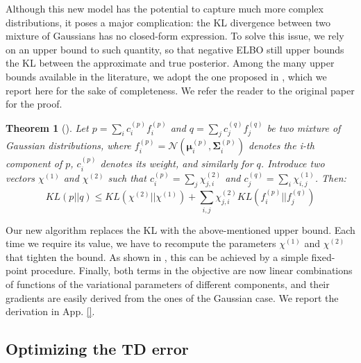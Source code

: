 \documentclass{article}
\newtheorem{theorem}{Theorem}
\begin{document}
Although this new model has the potential to capture much more complex distributions, it poses a major complication: the KL divergence between two mixture of Gaussians has no closed-form expression. To solve this issue, we rely on an upper bound to such quantity, so that negative ELBO still upper bounds the KL between the approximate and true posterior. Among the many upper bounds available in the literature, we adopt the one proposed in \cite{hershey2007approximating}, which we report here for the sake of completeness. We refer the reader to the original paper for the proof.
\begin{theorem}[\cite{hershey2007approximating}]
Let $p = \sum_{i} c_i^{(p)} f_i^{(p)}$ and $q = \sum_{j} c_j^{(q)} f_j^{(q)}$ be two mixture of Gaussian distributions, where $f_i^{(p)} = \mathcal{N}(\bm{\mu}_i^{(p)},\bm{\Sigma}_i^{(p)})$ denotes the i-th component of $p$, $c_i^{(p)}$ denotes its weight, and similarly for $q$. Introduce two vectors $\chi^{(1)}$ and $\chi^{(2)}$ such that $c_i^{(p)} = \sum_j \chi^{(2)}_{j,i}$ and $c_j^{(q)} = \sum_i \chi^{(1)}_{i,j}$. Then:
\begin{equation}
KL(p||q) \leq KL(\chi^{(2)}||\chi^{(1)}) + \sum_{i,j} \chi^{(2)}_{j,i}KL(f_i^{(p)}||f_j^{(q)})
\end{equation}
\end{theorem}
Our new algorithm replaces the KL with the above-mentioned upper bound. Each time we require its value, we have to recompute the parameters $\chi^{(1)}$ and $\chi^{(2)}$ that tighten the bound. As shown in \cite{hershey2007approximating}, this can be achieved by a simple fixed-point procedure. Finally, both terms in the objective are now linear combinations of functions of the variational parameters of different components, and their gradients are easily derived from the ones of the Gaussian case. We report the derivation in App. \ref{}.

\subsection{Optimizing the TD error} \label{sec:td}
\end{document}
